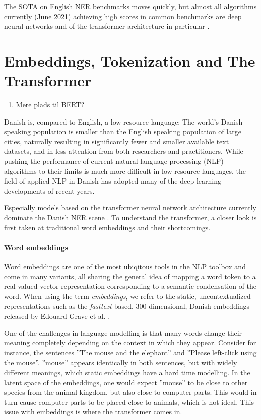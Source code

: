 \documentclass[main.tex]{subfiles}
\begin{document}
The SOTA on English NER benchmarks moves quickly, but almost all algorithms currently (June 2021) achieving high scores in common benchmarks are deep neural networks and of the transformer architecture in particular \cite{ruder21ner, pwc21ner}.

\section{Embeddings, Tokenization and The Transformer}
\label{sec:transformers}
\begin{enumerate}
    \item Mere plads til BERT?
\end{enumerate}
Danish is, compared to English, a low resource language:
The world's Danish speaking population is smaller than the English speaking population of large cities, naturally resulting in significantly fewer and smaller available text datasets, and in less attention from both researchers and practitioners.
While pushing the performance of current natural language processing (NLP) algorithms to their limits is much more difficult in low resource languages, the field of applied NLP in Danish has adopted many of the deep learning developments of recent years.

Especially models based on the transformer neural network architecture \cite{vaswani2017att} currently dominate the Danish NER scene \cite{danlp2021}.
To understand the transformer, a closer look is first taken at traditional word embeddings and their shortcomings.

\paragraph{Word embeddings}
Word embeddings are one of the most ubiqitous tools in the NLP toolbox and come in many variants, all sharing the general idea of mapping a word token to a real-valued vector representation corresponding to a semantic condensation of the word.
When using the term \emph{embeddings}, we refer to the static, uncontextualized representations such as the \emph{fasttext}-based, 300-dimensional, Danish embeddings released by Edouard Grave et al. \cite{grave2018learning}.

One of the challenges in language modelling is that many words change their meaning completely depending on the context in which they appear.
Consider for instance, the sentences ''The mouse and the elephant'' and ''Please left-click using the mouse''.
''mouse'' appears identically in both sentences, but with widely different meanings, which static embeddings have a hard time modelling.
In the latent space of the embeddings, one would expect ''mouse'' to be close to other species from the animal kingdom, but also close to computer parts.
This would in turn cause computer parts to be placed close to animals, which is not ideal.
This issue with embeddings is where the transformer comes in.
\end{document}
